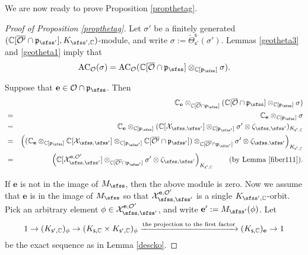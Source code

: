 \documentclass[12pt,a4paper]{amsart}
\newcommand{\CO}{{\mathcal {O}}}
\newcommand{\CX}{{\mathcal {X}}}
\newcommand{\p}{\mathfrak p}
\numberwithin{equation}{section}
\theoremstyle{remark}
\begin{document}
We are now ready to prove Proposition \ref{propthetag}.

\begin{proof}[Proof of Proposition \ref{propthetag}]
Let  $\sigma'$ be a finitely generated  $(\C[\overline{\CO'}\cap \p_{\sfss'}], K_{\sfss', \C})$-module, and write  $\sigma:=\check \Theta_{\mathsf s'}^{\mathsf s}(\sigma')$.
 Lemmas \ref{geotheta3} and \ref{geotheta1} imply that
\[
  \mathrm{AC}_{\CO}(\sigma)=\mathrm{AC}_{\CO}(\C[\overline \CO\cap \p_{\sfss}]\otimes_{\C[\p_{\sfss}]} \sigma).
\]

Suppose that $\mathbf e\in \CO\cap \p_\sfss$. Then
\begin{eqnarray*}
  && \C_\mathbf e \otimes_{\C[\overline \CO\cap \p_{\sfss}]} (\C[\overline \CO\cap \p_{\sfss}]\otimes_{\C[\p_{\sfss}]} \sigma)\\
  &=&  \C_\mathbf e \otimes_{\C[\p_{\sfss}]} \sigma\\
  &=&  \C_\mathbf e \otimes_{\C[\p_{\sfss}]} (\C[\CX_{\sfss, \sfss'}]\otimes_{\C[\p_{\sfss'}]} \sigma'\otimes \zeta_{\sfss, \sfss'})_{K_{\mathsf s', \C}} \\
   &=&\left( (\C_\mathbf e \otimes_{\C[\p_{\sfss}]} \C[\CX_{\sfss, \sfss'}]\otimes_{\C[\p_{\sfss'}]} \C[\overline{\CO'}\cap \p_{\sfss'}]) \otimes_{\C[\overline{\CO'}\cap \p_{\sfss'}]}\sigma'\otimes \zeta_{\sfss, \sfss'}\right)_{K_{\mathsf s', \C}} \\
      &=&\left( \C[\CX_{\sfss, \sfss'}^{\mathbf e, \CO'}] \otimes_{\C[\overline{\CO'}\cap \p_{\sfss'}]}\sigma'\otimes \zeta_{\sfss, \sfss'}\right)_{K_{\mathsf s', \C}} \qquad (\textrm{by Lemma \ref{fiber111}}).
\end{eqnarray*}

If $\mathbf e$ is not in the image of $M_\sfss$, then the above module is zero. Now we assume that $\mathbf e$ is in the image of $M_\sfss$ so that $\CX_{\sfss, \sfss'}^{\mathbf e, \CO'}$ is a single $K_{\sfss',\C}$-orbit. Pick an arbitrary element $\phi\in \CX_{\sfss, \sfss'}^{\mathbf e, \CO'}$, and write $\mathbf e':=M_{\sfss'}(\phi)$. Let
\[
  1\rightarrow  (K_{\mathsf s',\mathbb{C}})_\phi \rightarrow (K_{\mathsf s,\mathbb{C}}\times K_{\mathsf s', \mathbb{C}})_\phi\xrightarrow{\textrm{the projection to the first factor}} (K_{\mathsf s,\mathbb{C}})_{\mathbf e}\rightarrow 1
\]
be the exact  sequence as in Lemma \ref{descko}. %



\end{proof}
\end{document}
